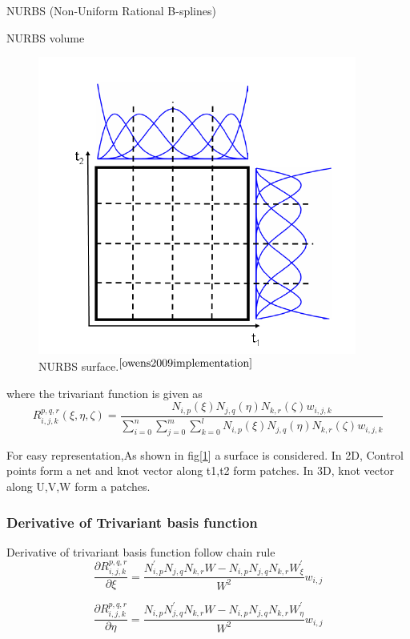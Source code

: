 \documentclass[a4paper,12pt,times]{article}
\begin{document}
\begin{section}{NURBS (Non-Uniform Rational B-splines) }
\begin{subsection}{NURBS volume}
\begin{figure}[h!]
\centering
\includegraphics[width=0.75\linewidth]{NURBS_2D_surface.png}
\caption{ NURBS surface.$^{\cite{owens2009implementation}}$}
\label{fig:NURBS surface}
\end{figure}

where the trivariant function is given as
\begin{equation}\label{Trivariant function}
R_{i, j, k}^{p, q, r}(\xi, \eta, \zeta)=\frac{N_{i, p}(\xi) N_{j, q}(\eta) N_{k, r}(\zeta) w_{i, j, k}}{\sum_{i=0}^{n} \sum_{j=0}^{m} \sum_{k=0}^{l} N_{i, p}(\xi) N_{j, q}(\eta) N_{k, r}(\zeta) w_{i, j, k}}
\end{equation}

For easy representation,As shown in fig[\ref{fig:NURBS surface}] a surface is considered. In 2D, Control points form a net and knot vector along t1,t2 form patches. In 3D, knot vector along U,V,W form a patches.

\subsubsection{Derivative of Trivariant basis function}
Derivative of trivariant basis function follow chain rule
\begin{equation}
\frac{\partial R_{i, j,k}^{p, q,r}}{\partial \xi}=\frac{N_{i, p}^{\prime} N_{j, q}N_{k, r} W-N_{i, p} N_{j, q} N_{k, r}W_{\xi}^{\prime}}{W^{2}} w_{i, j}
\end{equation}

\begin{equation}
\frac{\partial R_{i, j,k}^{p, q,r}}{\partial \eta}=\frac{N_{i, p} N_{j, q}^{\prime}N_{k, r} W-N_{i, p} N_{j, q} N_{k, r}W_{\eta}^{\prime}}{W^{2}} w_{i, j}
\end{equation}



\end{subsection}
\end{section}
\end{document}

